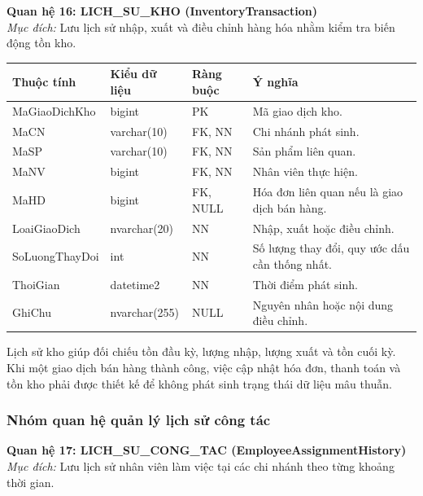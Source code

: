 \documentclass[11pt, a4paper]{article}
\begin{document}
\vspace{0.8em}
\textbf{Quan hệ 16: LICH\_SU\_KHO (InventoryTransaction)} \\
\textit{Mục đích:} Lưu lịch sử nhập, xuất và điều chỉnh hàng hóa nhằm kiểm tra biến động tồn kho.

\begin{small}
\begin{tabularx}{\textwidth}{| C{3.2cm} | C{2.2cm} | C{2.4cm} | Y |}
\hline
\textbf{Thuộc tính} & \textbf{Kiểu dữ liệu} & \textbf{Ràng buộc} & \textbf{Ý nghĩa} \\
\hline
MaGiaoDichKho & bigint & PK & Mã giao dịch kho. \\
\hline
MaCN & varchar(10) & FK, NN & Chi nhánh phát sinh. \\
\hline
MaSP & varchar(10) & FK, NN & Sản phẩm liên quan. \\
\hline
MaNV & bigint & FK, NN & Nhân viên thực hiện. \\
\hline
MaHD & bigint & FK, NULL & Hóa đơn liên quan nếu là giao dịch bán hàng. \\
\hline
LoaiGiaoDich & nvarchar(20) & NN & Nhập, xuất hoặc điều chỉnh. \\
\hline
SoLuongThayDoi & int & NN & Số lượng thay đổi, quy ước dấu cần thống nhất. \\
\hline
ThoiGian & datetime2 & NN & Thời điểm phát sinh. \\
\hline
GhiChu & nvarchar(255) & NULL & Nguyên nhân hoặc nội dung điều chỉnh. \\
\hline
\end{tabularx}
\end{small}

Lịch sử kho giúp đối chiếu tồn đầu kỳ, lượng nhập, lượng xuất và tồn cuối kỳ. Khi một giao dịch bán hàng thành công, việc cập nhật hóa đơn, thanh toán và tồn kho phải được thiết kế để không phát sinh trạng thái dữ liệu mâu thuẫn.

\subsubsection{Nhóm quan hệ quản lý lịch sử công tác}

\textbf{Quan hệ 17: LICH\_SU\_CONG\_TAC (EmployeeAssignmentHistory)} \\
\textit{Mục đích:} Lưu lịch sử nhân viên làm việc tại các chi nhánh theo từng khoảng thời gian.
\end{document}
